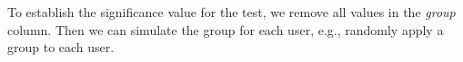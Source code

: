 To establish the significance value for the test, we remove all values in the \textit{group} column. Then we can simulate the group for each user, e.g., randomly apply a group to each user. 



